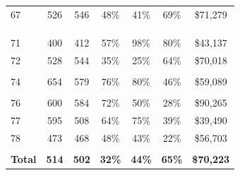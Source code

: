 \documentclass[
  12pt,
]{article}
\begin{document}
\begin{table}
{\begin{tabular}[t]{>{}l>{}c>{}c>{}c>{}c>{}c>{}c}
67 & 526 & 546 & 48\% & 41\% & 69\% & \$71,279\\
\cellcolor[HTML]{b9efe6}{68} & \cellcolor[HTML]{b9efe6}{541} & \cellcolor[HTML]{b9efe6}{540} & \cellcolor[HTML]{b9efe6}{41\%} & \cellcolor[HTML]{b9efe6}{26\%} & \cellcolor[HTML]{b9efe6}{62\%} & \cellcolor[HTML]{b9efe6}{\$79,260}\\
\cellcolor[HTML]{b9efe6}{69} & \cellcolor[HTML]{b9efe6}{390} & \cellcolor[HTML]{b9efe6}{395} & \cellcolor[HTML]{b9efe6}{36\%} & \cellcolor[HTML]{b9efe6}{92\%} & \cellcolor[HTML]{b9efe6}{74\%} & \cellcolor[HTML]{b9efe6}{\$43,391}\\
\cellcolor[HTML]{b9efe6}{70} & \cellcolor[HTML]{b9efe6}{595} & \cellcolor[HTML]{b9efe6}{581} & \cellcolor[HTML]{b9efe6}{56\%} & \cellcolor[HTML]{b9efe6}{33\%} & \cellcolor[HTML]{b9efe6}{48\%} & \cellcolor[HTML]{b9efe6}{\$105,721}\\
71 & 400 & 412 & 57\% & 98\% & 80\% & \$43,137\\
72 & 528 & 544 & 35\% & 25\% & 64\% & \$70,018\\
\cellcolor[HTML]{b9efe6}{73} & \cellcolor[HTML]{b9efe6}{451} & \cellcolor[HTML]{b9efe6}{438} & \cellcolor[HTML]{b9efe6}{24\%} & \cellcolor[HTML]{b9efe6}{89\%} & \cellcolor[HTML]{b9efe6}{76\%} & \cellcolor[HTML]{b9efe6}{\$48,406}\\
74 & 654 & 579 & 76\% & 80\% & 46\% & \$59,089\\
\cellcolor[HTML]{b9efe6}{75} & \cellcolor[HTML]{b9efe6}{514} & \cellcolor[HTML]{b9efe6}{502} & \cellcolor[HTML]{b9efe6}{31\%} & \cellcolor[HTML]{b9efe6}{20\%} & \cellcolor[HTML]{b9efe6}{71\%} & \cellcolor[HTML]{b9efe6}{\$72,850}\\
76 & 600 & 584 & 72\% & 50\% & 28\% & \$90,265\\
77 & 595 & 508 & 64\% & 75\% & 39\% & \$39,490\\
78 & 473 & 468 & 48\% & 43\% & 22\% & \$56,703\\
\cellcolor[HTML]{b9efe6}{79} & \cellcolor[HTML]{b9efe6}{594} & \cellcolor[HTML]{b9efe6}{585} & \cellcolor[HTML]{b9efe6}{61\%} & \cellcolor[HTML]{b9efe6}{26\%} & \cellcolor[HTML]{b9efe6}{71\%} & \cellcolor[HTML]{b9efe6}{\$65,180}\\
\addlinespace
\textbf{Total} & \textbf{514} & \textbf{502} & \textbf{32\%} & \textbf{44\%} & \textbf{65\%} & \textbf{\$70,223}\\
\bottomrule
\end{tabular}}
\end{table}
\begingroup
\fontsize{10}{10}\selectfont
\end{document}
